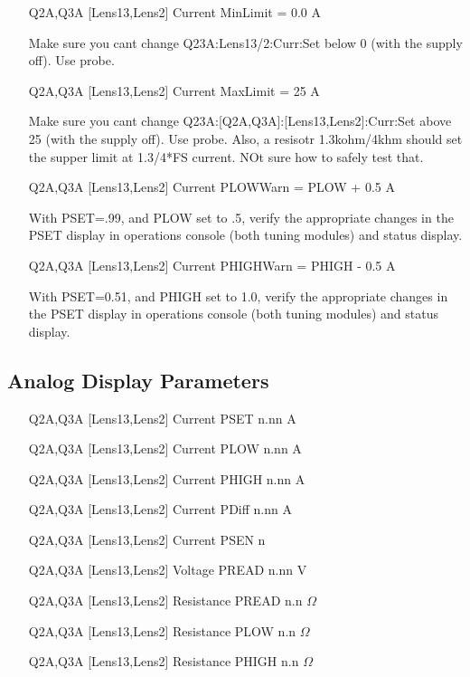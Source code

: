 \documentclass[11pt]{book}		%
\begin{document}
\begin{enumerate}
 \item [Q2A,Q3A] [Lens13,Lens2] Current MinLimit = 0.0 A

\color{red}
Make sure you cant change Q23A:Lens13/2:Curr:Set below 0 (with the supply off). Use probe.
\color{black}

 \item [Q2A,Q3A] [Lens13,Lens2] Current MaxLimit = 25 A

\color{red}
Make sure you cant change Q23A:[Q2A,Q3A]:[Lens13,Lens2]:Curr:Set above 25 (with the supply off). Use probe. Also, a resisotr 1.3kohm/4khm should set the supper limit at 1.3/4*FS current. NOt sure how to safely test that.
\color{black}

 \item [Q2A,Q3A] [Lens13,Lens2] Current PLOWWarn = PLOW + 0.5 A

\color{red}
With PSET=.99, and PLOW set to .5, verify the appropriate changes in the PSET display in operations console (both tuning modules) and status display.
\color{black}

 \item [Q2A,Q3A] [Lens13,Lens2] Current PHIGHWarn = PHIGH - 0.5 A

\color{red}
With PSET=0.51, and PHIGH set to 1.0, verify the appropriate changes in the PSET display in operations console (both tuning modules) and status display.
\color{black}

\end{enumerate}

\subsection{Analog Display Parameters} \label{sect:cyc-equip-ctl-beamline-quad23a-analog-display}

\begin{enumerate}
 \item [Q2A,Q3A] [Lens13,Lens2] Current PSET  n.nn A
 \item [Q2A,Q3A] [Lens13,Lens2] Current PLOW  n.nn A
 \item [Q2A,Q3A] [Lens13,Lens2] Current PHIGH n.nn A
 \item [Q2A,Q3A] [Lens13,Lens2] Current PDiff n.nn A
 \item [Q2A,Q3A] [Lens13,Lens2] Current PSEN  n
 \item [Q2A,Q3A] [Lens13,Lens2] Voltage PREAD n.nn V
 \item [Q2A,Q3A] [Lens13,Lens2] Resistance PREAD n.n $\Omega$
 \item [Q2A,Q3A] [Lens13,Lens2] Resistance PLOW n.n $\Omega$
 \item [Q2A,Q3A] [Lens13,Lens2] Resistance PHIGH n.n $\Omega$
\end{enumerate}
\end{document}
